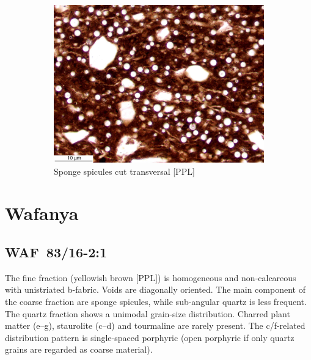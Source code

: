 \documentclass[a4paper]{article}
\begin{document}
\begin{figure}[H]
\begin{subfigure}[t]{.32\textwidth}
		\includegraphics[width=\textwidth]{ThinSections/108-2_20x_PPL.jpg}
		\caption{Sponge spicules cut transversal [PPL]}
	\end{subfigure}
	\caption{}
	\label{fig:108_mun}
\end{figure}

\newpage\section{Wafanya}

\subsection{WAF~83/16-2:1 \citep[waf\#47; Fig.~\ref{fig:wafmon.pottery}.2; Monkoto style;][504 Pl.~70.10]{Wotzka.1995}}

\begin{multicols}{2}
\noindent The fine fraction (yellowish brown [PPL]) is homogeneous and non-calcareous with unistriated b-fabric. Voids are diagonally oriented. The main component of the coarse fraction are sponge spicules, while sub-angular quartz is less frequent. The quartz fraction shows a unimodal grain-size distribution. Charred plant matter (e--g), staurolite (c--d) and tourmaline are rarely present. The c/f-related distribution pattern is single-spaced porphyric (open porphyric if only quartz grains are regarded as coarse material).
\end{multicols}
\end{document}
